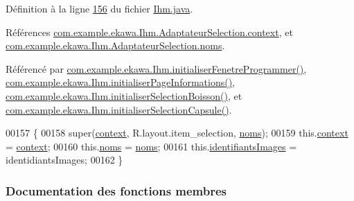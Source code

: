 Définition à la ligne \hyperlink{_ihm_8java_source_l00156}{156} du fichier \hyperlink{_ihm_8java_source}{Ihm.\+java}.



Références \hyperlink{_ihm_8java_source_l00152}{com.\+example.\+ekawa.\+Ihm.\+Adaptateur\+Selection.\+context}, et \hyperlink{_ihm_8java_source_l00153}{com.\+example.\+ekawa.\+Ihm.\+Adaptateur\+Selection.\+noms}.



Référencé par \hyperlink{_ihm_8java_source_l00727}{com.\+example.\+ekawa.\+Ihm.\+initialiser\+Fenetre\+Programmer()}, \hyperlink{_ihm_8java_source_l00637}{com.\+example.\+ekawa.\+Ihm.\+initialiser\+Page\+Informations()}, \hyperlink{_ihm_8java_source_l00470}{com.\+example.\+ekawa.\+Ihm.\+initialiser\+Selection\+Boisson()}, et \hyperlink{_ihm_8java_source_l00413}{com.\+example.\+ekawa.\+Ihm.\+initialiser\+Selection\+Capsule()}.


\begin{DoxyCode}
00157         \{
00158             super(\hyperlink{classcom_1_1example_1_1ekawa_1_1_ihm_1_1_adaptateur_selection_a9605d2f9384114fcb57da610a7071676}{context}, R.layout.item\_selection, \hyperlink{classcom_1_1example_1_1ekawa_1_1_ihm_1_1_adaptateur_selection_a5d71a6dd60ad53aa95ae59bb094b4002}{noms});
00159             this.\hyperlink{classcom_1_1example_1_1ekawa_1_1_ihm_1_1_adaptateur_selection_a9605d2f9384114fcb57da610a7071676}{context} = \hyperlink{classcom_1_1example_1_1ekawa_1_1_ihm_1_1_adaptateur_selection_a9605d2f9384114fcb57da610a7071676}{context};
00160             this.\hyperlink{classcom_1_1example_1_1ekawa_1_1_ihm_1_1_adaptateur_selection_a5d71a6dd60ad53aa95ae59bb094b4002}{noms} = \hyperlink{classcom_1_1example_1_1ekawa_1_1_ihm_1_1_adaptateur_selection_a5d71a6dd60ad53aa95ae59bb094b4002}{noms};
00161             this.\hyperlink{classcom_1_1example_1_1ekawa_1_1_ihm_1_1_adaptateur_selection_ac242f0e242c82c556fb9bba16a5207d1}{identifiantsImages} = identidiantsImages;
00162         \}
\end{DoxyCode}


\subsubsection{Documentation des fonctions membres}
\mbox{\label{classcom_1_1example_1_1ekawa_1_1_ihm_1_1_adaptateur_selection_a9c763267cefd3c67f449b8a797cdf916}} 
